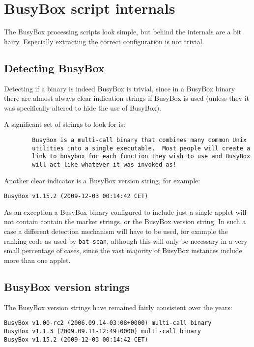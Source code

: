 \documentclass[10pt]{article}
\begin{document}
\section{BusyBox script internals}

The BusyBox processing scripts look simple, but behind the internals are a bit
hairy. Especially extracting the correct configuration is not trivial.

\subsection{Detecting BusyBox}

Detecting if a binary is indeed BusyBox is trivial, since in a BusyBox binary
there are almost always clear indication strings if BusyBox is used (unless
they it was specifically altered to hide the use of BusyBox).

A significant set of strings to look for is:

\begin{verbatim}
        BusyBox is a multi-call binary that combines many common Unix
        utilities into a single executable.  Most people will create a
        link to busybox for each function they wish to use and BusyBox
        will act like whatever it was invoked as!
\end{verbatim}

Another clear indicator is a BusyBox version string, for example:

\begin{verbatim}
BusyBox v1.15.2 (2009-12-03 00:14:42 CET)
\end{verbatim}

As an exception a BusyBox binary configured to include just a single applet
will not contain contain the marker strings, or the BusyBox version string. In
such a case a different detection mechanism will have to be used, for example
the ranking code as used by \texttt{bat-scan}, although this will only be
necessary in a very small percentage of cases, since the vast majority of
BusyBox instances include more than one applet.

\subsection{BusyBox version strings}

The BusyBox version strings have remained fairly consistent over the years:

\begin{verbatim}
BusyBox v1.00-rc2 (2006.09.14-03:08+0000) multi-call binary
BusyBox v1.1.3 (2009.09.11-12:49+0000) multi-call binary
BusyBox v1.15.2 (2009-12-03 00:14:42 CET)
\end{verbatim}
\end{document}
